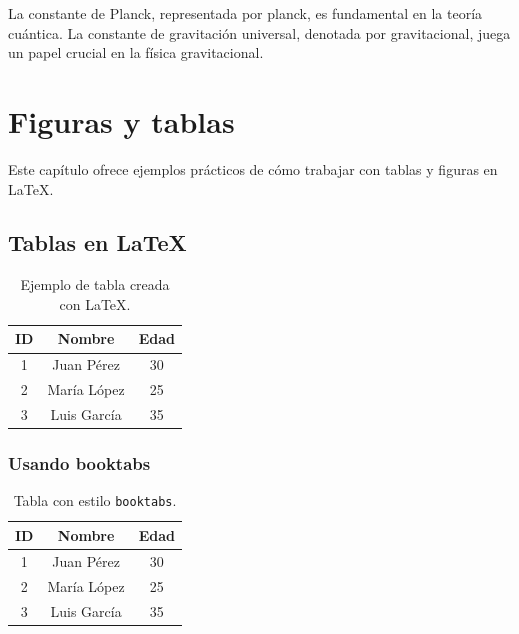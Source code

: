  La constante de Planck, representada por \gls{planck}, es fundamental en la teoría cuántica.  
 La constante de gravitación universal, denotada por \gls{gravitacional}, juega un papel crucial en la física gravitacional.

 \clearpage 

 \clearpage %
 \section{Figuras y tablas}

 Este capítulo ofrece ejemplos prácticos de cómo trabajar con tablas y figuras en \LaTeX.
 
  
  \subsection{Tablas en \LaTeX}
  
  \begin{table}[H] %
      \centering
      \begin{tabular}{|c|c|c|} %
          \hline
          \textbf{ID} & \textbf{Nombre} & \textbf{Edad} \\
          \hline
          1 & Juan Pérez  & 30 \\
          2 & María López & 25 \\
          3 & Luis García & 35 \\
          \hline
      \end{tabular}
      \caption{Ejemplo de tabla creada con \LaTeX.}
      \label{tab:ejemplo_tabla}
  \end{table}
  
 \subsubsection{Usando booktabs}

 \begin{table}[H]
   \centering
   \begin{tabular}{ccc}
     \toprule
     ID & Nombre & Edad \\
     \midrule
     1 & Juan Pérez  & 30 \\
     2 & María López & 25 \\
     3 & Luis García & 35 \\
     \bottomrule
   \end{tabular}
   \caption{Tabla con estilo \texttt{booktabs}.}
   \label{tab:booktabs}
 \end{table}
 

